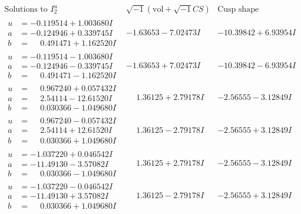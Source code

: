 \documentclass[1p]{elsarticle_modified}
\theoremstyle{definition}
\newcommand{\I}{\sqrt{-1}}
\begin{document}
$$\begin{array}{c|c|c}  
\text{Solutions to }I^u_{2}& \I (\text{vol} + \sqrt{-1}CS) & \text{Cusp shape}\\
 \hline 
\begin{aligned}
u &= -0.119514 + 1.003680 I \\
a &= -0.124946 + 0.339745 I \\
b &= \phantom{-}0.491471 + 1.162520 I\end{aligned}
 & -1.63653 - 7.02473 I & -10.39842 + 6.93954 I \\ \hline\begin{aligned}
u &= -0.119514 - 1.003680 I \\
a &= -0.124946 - 0.339745 I \\
b &= \phantom{-}0.491471 - 1.162520 I\end{aligned}
 & -1.63653 + 7.02473 I & -10.39842 - 6.93954 I \\ \hline\begin{aligned}
u &= \phantom{-}0.967240 + 0.057432 I \\
a &= \phantom{-}2.54114 - 12.61520 I \\
b &= \phantom{-}0.030366 - 1.049680 I\end{aligned}
 & \phantom{-}1.36125 + 2.79178 I & -2.56555 - 3.12849 I \\ \hline\begin{aligned}
u &= \phantom{-}0.967240 - 0.057432 I \\
a &= \phantom{-}2.54114 + 12.61520 I \\
b &= \phantom{-}0.030366 + 1.049680 I\end{aligned}
 & \phantom{-}1.36125 - 2.79178 I & -2.56555 + 3.12849 I \\ \hline\begin{aligned}
u &= -1.037220 + 0.046542 I \\
a &= -11.49130 - 3.57082 I \\
b &= \phantom{-}0.030366 - 1.049680 I\end{aligned}
 & \phantom{-}1.36125 + 2.79178 I & -2.56555 - 3.12849 I \\ \hline\begin{aligned}
u &= -1.037220 - 0.046542 I \\
a &= -11.49130 + 3.57082 I \\
b &= \phantom{-}0.030366 + 1.049680 I\end{aligned}
 & \phantom{-}1.36125 - 2.79178 I & -2.56555 + 3.12849 I \\ \hline\begin{aligned}

\end{aligned}
\end{array}$$
\end{document}
